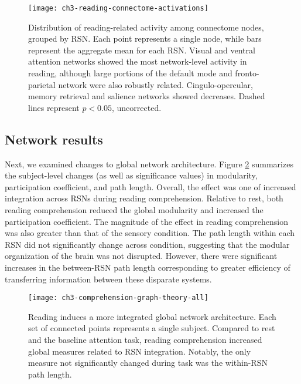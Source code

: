 \begin{figure}[t]
	\centering
	\texttt{[image: ch3-reading-connectome-activations]}
    \caption[Distribution of reading-related activity among RSN nodes.]{Distribution of reading-related activity among connectome nodes, grouped by RSN. Each point represents a single node, while bars represent the aggregate mean for each RSN. Visual and ventral attention networks showed the most network-level activity in reading, although large portions of the default mode and fronto-parietal network were also robustly related. Cingulo-opercular, memory retrieval and salience networks showed decreases. Dashed lines represent $p < 0.05$, uncorrected.}
	\label{fig:ch3-reading-connectome-activations}
\end{figure}


\subsection{Network results}

Next, we examined changes to global network architecture. Figure \ref{fig:ch3-comprehension-graph-theory-all} summarizes the subject-level changes (as well as significance values) in modularity, participation coefficient, and path length. Overall, the effect was one of increased integration across RSNs during reading comprehension. Relative to rest, both reading comprehension reduced the global modularity and increased the participation coefficient. The magnitude of the effect in reading comprehension was also greater than that of the sensory condition. The path length within each RSN did not significantly change across condition, suggesting that the modular organization of the brain was not disrupted.  However, there were significant increases in the between-RSN path length corresponding to greater efficiency of transferring information between these disparate systems.

\begin{figure}[t]
	\centering
	\texttt{[image: ch3-comprehension-graph-theory-all]}
    \caption[Reading induces a more integrated global network architecture.]{Reading induces a more integrated global network architecture. Each set of connected points represents a single subject. Compared to rest and the baseline attention task, reading comprehension increased global measures related to RSN integration. Notably, the only measure not significantly changed during task was the within-RSN path length.}
	\label{fig:ch3-comprehension-graph-theory-all}
\end{figure}

